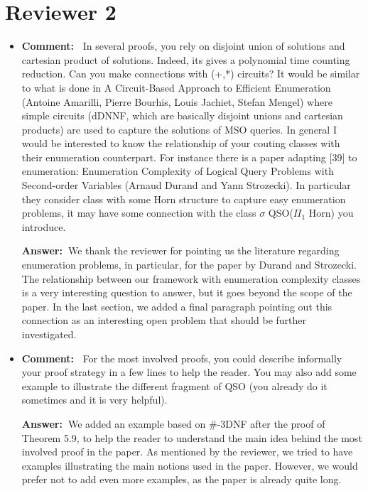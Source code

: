 \documentclass[a4paper]{article}
\newcommand{\ans}{{\bf Answer:\ }}
\newcommand{\cm}[1]{{\bf Comment:\ } #1}
\begin{document}
\bigskip

\section*{Reviewer 2}

\begin{itemize}
	\setlength\itemsep{0.5em}
	\item \cm{In several proofs, you rely on disjoint union of solutions and cartesian product of solutions. Indeed, its gives a polynomial time counting reduction. Can you make connections with (+,*) circuits? It would be similar to what is done in A Circuit-Based Approach to Efficient Enumeration (Antoine Amarilli, Pierre Bourhis, Louis Jachiet, Stefan Mengel) where simple circuits (dDNNF, which are basically disjoint unions and cartesian products) are used to capture the solutions of MSO queries. In general I would be interested to know the relationship of your couting classes with their enumeration counterpart. 
	For instance there is a paper adapting [39] to enumeration: Enumeration Complexity of Logical Query Problems with Second-order Variables (Arnaud Durand and Yann Strozecki). In particular they consider class with some Horn structure to capture easy enumeration problems, it may have some connection with the class $\sigma$ QSO($\Pi_1$ Horn) you introduce.}

	\ans We thank the reviewer for pointing us the literature regarding enumeration problems, in particular, for the paper by Durand and Strozecki. The relationship between our framework with enumeration complexity classes is a very interesting question to answer, but it goes beyond the scope of the paper. In the last section, we added a final paragraph pointing out this connection as an interesting open problem that should be further investigated. 
	
	\item \cm{For the most involved proofs, you could describe informally your proof strategy in a few lines to help the reader. You may also add some example to illustrate the different fragment of QSO (you already do it sometimes and it is very helpful).}
	
	\ans We added an example based on \#-3DNF after the proof of Theorem 5.9, to help the reader to understand the main idea behind the most involved proof in the paper. As mentioned by the reviewer, we tried to have examples illustrating the main notions used in the paper. However, we would prefer not to add even more examples, as the paper is already quite long.
	

\end{itemize}
\end{document}
